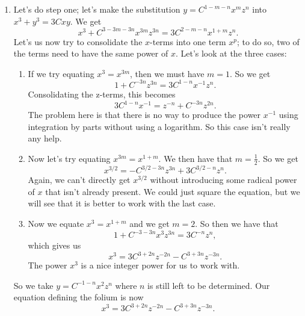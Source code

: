 \begin{enumerate}
\item Let's do step one; let's make the substitution \(y = C^{1 - m - n} x^m z^n\) into \(x^3 + y^3 = 3Cxy\). We get
\begin{equation}
x^3 + C^{3 - 3m - 3n} x^{3m} z^{3n} = 3C^{2 - m - n} x^{1 + m} z^n.
\end{equation}
Let's us now try to consolidate the \(x\)-terms into one term \(x^p\); to do so, two of the terms need to have the same power of \(x\). 
Let's look at the three cases:
    \begin{enumerate}
    \item If we try equating \(x^3 = x^{3m}\), then we must have \(m = 1\). So we get
    \begin{equation}
    1 + C^{-3n} z^{3n} = 3C^{1 - n} x^{-1} z^n.
    \end{equation} 
    Consolidating the z-terms, this becomes
    \begin{equation}
    3C^{1 - n} x^{-1} = z^{-n} + C^{-3n} z^{2n}.
    \end{equation}
    The problem here is that there is no way to produce the power \(x^{-1}\) using integration by parts without using a logarithm. So
    this case isn't really any help.

    \item Now let's try equating \(x^{3m} = x^{1 + m}\). We then have that \(m = \frac{1}{2}\). So we get
    \begin{equation}
    x^{3/2} = -C^{3/2 - 3n} z^{3n} + 3 C^{3/2 - n} z^n.
    \end{equation}   
    Again, we can't directly get \(x^{3/2}\) without introducing some radical power of \(x\) that isn't already present. We could just
    square the equation, but we will see that it is better to work with the last case.

    \item Now we equate \(x^3 = x^{1 + m}\) and we get \(m = 2\). So then we have that
    \begin{equation}
    1 + C^{-3 - 3n} x^3 z^{3n} = 3C^{-n} z^n,
    \end{equation}
    which gives us
    \begin{equation}
    x^3 = 3C^{3 + 2n} z^{-2n} -C^{3 + 3n} z^{-3n}. 
    \end{equation}
    The power \(x^3\) is a nice integer power for us to work with.
    \end{enumerate}

So we take \(y = C^{-1 - n} x^2 z^n\) where \(n\) is still left to be determined. Our equation defining the folium is now
\begin{equation}
x^3 = 3C^{3 + 2n} z^{-2n} - C^{3 + 3n} z^{-3n}.
\end{equation}


\end{enumerate}
